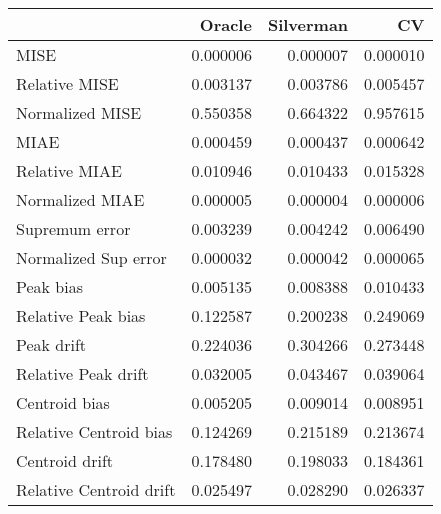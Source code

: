 \begin{tabular}{lrrr}
  \toprule
 & Oracle & Silverman & CV \\ 
  \midrule
MISE & 0.000006 & 0.000007 & 0.000010 \\ 
  Relative MISE & 0.003137 & 0.003786 & 0.005457 \\ 
  Normalized MISE & 0.550358 & 0.664322 & 0.957615 \\ 
  MIAE & 0.000459 & 0.000437 & 0.000642 \\ 
  Relative MIAE & 0.010946 & 0.010433 & 0.015328 \\ 
  Normalized MIAE & 0.000005 & 0.000004 & 0.000006 \\ 
  Supremum error & 0.003239 & 0.004242 & 0.006490 \\ 
  Normalized Sup error & 0.000032 & 0.000042 & 0.000065 \\ 
  Peak bias & 0.005135 & 0.008388 & 0.010433 \\ 
  Relative Peak bias & 0.122587 & 0.200238 & 0.249069 \\ 
  Peak drift & 0.224036 & 0.304266 & 0.273448 \\ 
  Relative Peak drift & 0.032005 & 0.043467 & 0.039064 \\ 
  Centroid bias & 0.005205 & 0.009014 & 0.008951 \\ 
  Relative Centroid bias & 0.124269 & 0.215189 & 0.213674 \\ 
  Centroid drift & 0.178480 & 0.198033 & 0.184361 \\ 
  Relative Centroid drift & 0.025497 & 0.028290 & 0.026337 \\ 
   \bottomrule
\end{tabular}
